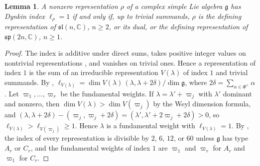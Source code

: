 \documentclass [leqno, 10pt]{amsart}
\newtheorem{lemma}[theorem]{Lemma}%
\theoremstyle{definition}
\numberwithin{equation}{section}
\renewcommand{\sp}{\mathfrak{sp}}
\newcommand{\al}{\alpha}
\newcommand{\sll}{\mathfrak{sl}}
\newcommand{\g}{\mathfrak{g}}
\newcommand{\com}{\mathbb C}
\begin{document}
\begin{lemma}\label{lem:indexone}
A nonzero representation $\rho$ of a complex simple Lie algebra $\g$ has Dynkin index $\ell_{\rho} = 1$ if and only if, up to trivial summands, $\rho$ is the defining representation of $\sll(n, \com)$, $n \geq 2$, or its dual, or the defining representation of $\sp(2n, \com)$, $n \geq 1$.
\end{lemma}
\begin{proof}
The index is additive under direct sums, takes positive integer values on nontrivial representations \cite[Theorem~2.2]{Dynkin-semisimplesubalgebras}, and vanishes on trivial ones. Hence a representation of index $1$ is the sum of an irreducible representation $V(\lambda)$ of index $1$ and trivial summands. By \cite[Theorem~2.5]{Dynkin-semisimplesubalgebras}, $\ell_{V(\lambda)} = \dim V(\lambda)\,(\lambda, \lambda + 2\delta)/\dim \g$, where $2\delta = \sum_{\al \in \Phi^{+}}\al$. Let $\varpi_{1}, \dots, \varpi_{r}$ be the fundamental weights. If $\lambda = \lambda' + \varpi_{j}$ with $\lambda'$ dominant and nonzero, then $\dim V(\lambda) > \dim V(\varpi_{j})$ by the Weyl dimension formula, and $(\lambda, \lambda + 2\delta) - (\varpi_{j}, \varpi_{j} + 2\delta) = (\lambda', \lambda' + 2\varpi_{j} + 2\delta) > 0$, so $\ell_{V(\lambda)} > \ell_{V(\varpi_{j})} \geq 1$. Hence $\lambda$ is a fundamental weight with $\ell_{V(\lambda)} = 1$. By \cite[Proposition~2.6]{Laszlo-Sorger}, the index of every representation is divisible by $2$, $6$, $12$, or $60$ unless $\g$ has type $A_{r}$ or $C_{r}$, and the fundamental weights of index $1$ are $\varpi_{1}$ and $\varpi_{r}$ for $A_{r}$ and $\varpi_{1}$ for $C_{r}$.
\end{proof}
\end{document}
